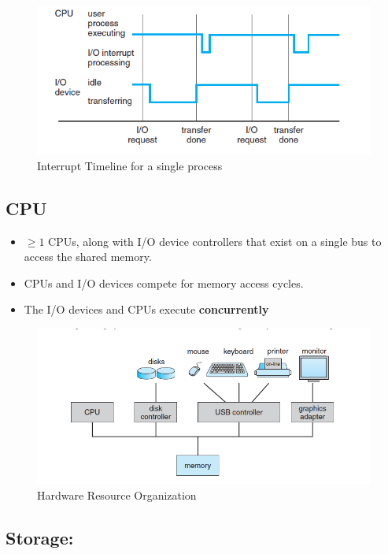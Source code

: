 \documentclass{article}
\theoremstyle{plain}
\theoremstyle{definition}
\begin{document}
\begin{figure}[ht]
    \centering
    \includegraphics[scale=0.6]{os2.png}
    \caption{Interrupt Timeline for a single process}
    \label{fig:my_label1}
\end{figure}

\subsection{CPU}

\begin{itemize}
    \item $\geq 1$ CPUs, along with I/O device controllers that exist on a single bus to access the shared memory.  
    
    \item CPUs and I/O devices compete for memory access cycles. 
    
    \item The I/O devices and CPUs execute \textbf{concurrently}
\end{itemize}

\begin{figure}[h]
    \centering
    \includegraphics[scale=0.85]{os1.png}
    \caption{Hardware Resource Organization}
    \label{fig:my_label}
\end{figure}

\subsection{Storage:}
\end{document}
